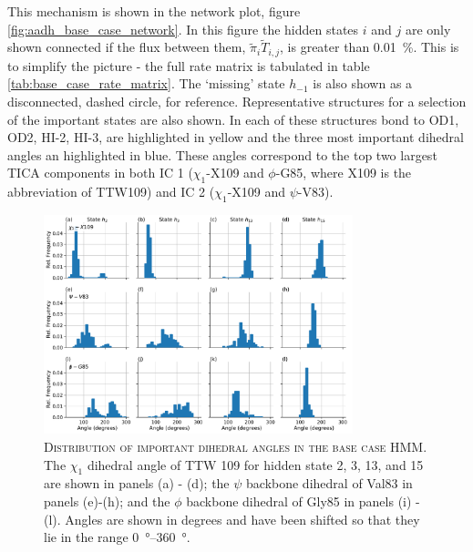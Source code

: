  This mechanism is shown in the network plot, figure \ref{fig:aadh_base_case_network}. In this figure the hidden states $i$ and $j$ are only shown connected if the flux between them, $\tilde{\pi}_{i}\tilde{T}_{i,j}$, is greater than \SI{0.01}{\percent}. This is to simplify the picture - the full rate matrix is tabulated in table \ref{tab:base_case_rate_matrix}. The `missing' state $h_{-1}$ is also shown as a disconnected, dashed circle, for reference. Representative structures for a selection of the important states are also shown. In each of these structures bond to OD1, OD2, HI-2, HI-3, are highlighted in yellow and the three most important dihedral angles an highlighted in blue. These angles correspond to the top two largest TICA components in both IC 1 ($\chi_1$-X109 and $\phi$-G85, where X109 is the abbreviation of TTW109) and IC 2 ($\chi_1$-X109 and $\psi$-V83). 
 
\begin{figure}
    \centering
    \includegraphics[width=0.8\textwidth]{chapters/aadh/figures/base_case_important_dihedrals.pdf}
    \caption[Distribution of important dihedral angles in the base case HMM]{\textsc{Distribution of important dihedral angles in the base case HMM}. The $\chi_{1}$ dihedral angle of TTW 109 for hidden state 2, 3, 13, and 15 are shown in panels (a) - (d); the $\psi$ backbone dihedral of Val83 in panels (e)-(h); and the $\phi$ backbone dihedral of Gly85 in panels (i) - (l). Angles are shown in degrees and have been shifted so that they lie in the range \SIrange{0}{360}{\degree}.}
    \label{fig:aadh_base_case_dihedrals}
\end{figure}

